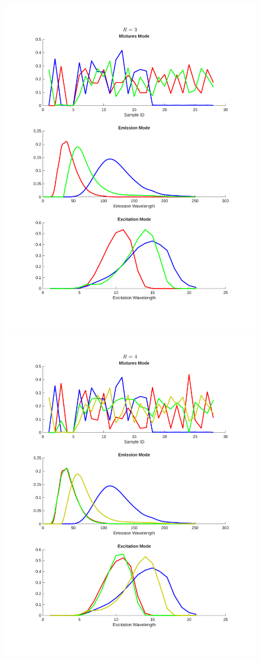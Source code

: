 \begin{figure}[H]
    \centering
    \includegraphics[trim = 4.2cm 8cm 4.2cm 8cm, clip, width=0.46\linewidth]{figures/factors_rank3.pdf}
    \includegraphics[trim = 4.2cm 8cm 4.2cm 8cm, clip, width=0.46\linewidth]{figures/factors_rank4.pdf}
    \caption{}
    \label{fig:plot_factors}
\end{figure}